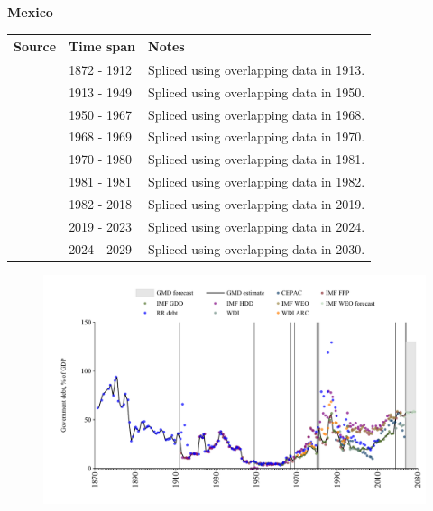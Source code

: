 \documentclass[12pt,a4paper,landscape]{article}
\begin{document}
\begin{adjustbox}{max totalsize={\paperwidth}{\paperheight},center}
\begin{minipage}[t][\textheight][t]{\textwidth}
\vspace*{0.5cm}
{}
\begin{center}
{\Large\bfseries Mexico}
\end{center}
\vspace{0.5cm}
\begin{table}[H]
\centering
\small
\begin{tabular}{|l|l|l|}
\hline
\textbf{Source} & \textbf{Time span} & \textbf{Notes} \\
\hline
\rowcolor{white}\cite{RR_debt}& 1872 - 1912 &Spliced using overlapping data in 1913.\\
\rowcolor{lightgray}\cite{IMF_FPP}& 1913 - 1949 &Spliced using overlapping data in 1950.\\
\rowcolor{white}\cite{IMF_GDD}& 1950 - 1967 &Spliced using overlapping data in 1968.\\
\rowcolor{lightgray}\cite{IMF_FPP}& 1968 - 1969 &Spliced using overlapping data in 1970.\\
\rowcolor{white}\cite{IMF_GDD}& 1970 - 1980 &Spliced using overlapping data in 1981.\\
\rowcolor{lightgray}\cite{IMF_FPP}& 1981 - 1981 &Spliced using overlapping data in 1982.\\
\rowcolor{white}\cite{IMF_GDD}& 1982 - 2018 &Spliced using overlapping data in 2019.\\
\rowcolor{lightgray}\cite{IMF_FPP}& 2019 - 2023 &Spliced using overlapping data in 2024.\\
\rowcolor{white}\cite{IMF_WEO_forecast}& 2024 - 2029 &Spliced using overlapping data in 2030.\\
\hline
\end{tabular}
\end{table}
\begin{figure}[H]
\centering
\includegraphics[width=\textwidth,height=0.6\textheight,keepaspectratio]{graphs/MEX_govdebt_GDP.pdf}
\end{figure}
\end{minipage}
\end{adjustbox}
\end{document}
